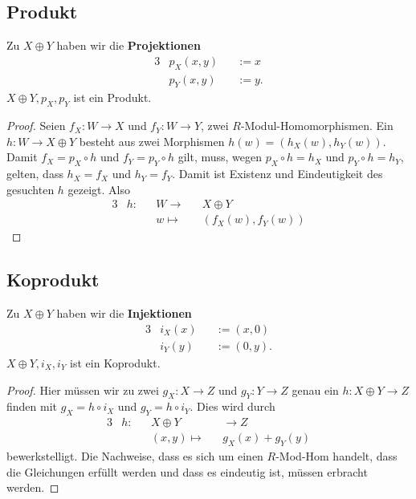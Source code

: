 \documentclass[a4paper]{amsart}
\theoremstyle{definition}
\begin{document}
\subsection{Produkt}
Zu $X \oplus Y$ haben wir die \textbf{Projektionen}
\begin{alignat}{3}
   &p_X(x,y) &&:= x\\
   &p_Y(x,y) &&:= y.
\end{alignat}
$X \oplus Y, p_X, p_Y$ ist ein Produkt.
\begin{proof}
   Seien $f_X \colon W \to X$ und $f_Y \colon W \to Y$, zwei $R$-Modul-Homomorphismen. 
   Ein $h \colon W \to X \oplus  Y$ besteht aus zwei Morphismen $h(w) = (h_X(w), h_Y(w))$. Damit
   $f_X = p_X \circ h$ und $f_Y = p_Y \circ h$ gilt, muss, wegen $p_X \circ h = h_X$ und $p_Y \circ h = h_Y$, gelten, dass $h_X = f_X$ und $h_Y = f_Y$. Damit ist Existenz und Eindeutigkeit des gesuchten $h$ gezeigt.
   Also
   \begin{alignat}{3}
      &h \colon &&W \to &&X \oplus Y\\
      &         &&w \mapsto && (f_X(w), f_Y(w))
   \end{alignat}
\end{proof}

\subsection{Koprodukt}
Zu $X \oplus Y$ haben wir die \textbf{Injektionen}
\begin{alignat}{3}
   &i_X(x) &&:= (x, 0)\\
   &i_Y(y) &&:= (0, y).
\end{alignat}
$X \oplus Y, i_X, i_Y$ ist ein Koprodukt.
\begin{proof}
   Hier müssen wir zu zwei $g_X \colon X \to Z$ und $g_Y \colon Y \to Z$ genau ein $h \colon X \oplus  Y \to Z$ finden mit $g_X = h \circ i_X$ und $g_Y = h \circ i_Y$. Dies wird durch
   \begin{alignat}{3}
      &h \colon &&X \oplus Y &&\to Z\\
      &         &&(x,y) \mapsto && g_X(x) + g_Y(y)
   \end{alignat}
   bewerkstelligt. Die Nachweise, dass es sich um einen $R$-Mod-Hom handelt, dass die Gleichungen erfüllt werden und dass es eindeutig ist, müssen erbracht werden.
\end{proof}
\end{document}
